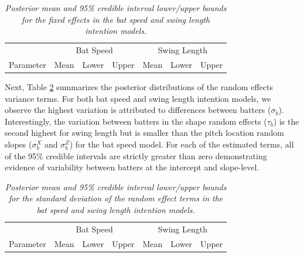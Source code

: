 \documentclass{article}
\begin{document}
      \begin{table}
        \centering
        \begin{tabular}{l|rrr|rrr|}
                  & \multicolumn{3}{c|}{Bat Speed}          & \multicolumn{3}{c|}{Swing Length}  \\
        Parameter & Mean  & Lower  & Upper & Mean  & Lower  & Upper \\
          \hline
          
        \end{tabular}
        \caption{\it Posterior mean and 95\% credible interval lower/upper bounds for the fixed effects in the bat speed and swing length intention models.}
        \label{tab:fixed-effects}
      \end{table}

      Next, Table \ref{tab:intention-variances} summarizes the posterior distributions of the random effects variance terms. For both bat speed and swing length intention models, we observe the highest variation is attributed to differences between batters ($\sigma_b$). Interestingly, the variation between batters in the shape random effects ($\tau_b$) is the second highest for swing length but is smaller than the pitch location random slopes ($\sigma_b^X$ and $\sigma_b^Z$) for the bat speed model. For each of the estimated terms, all of the 95\% credible intervals are strictly greater than zero demonstrating evidence of variability between batters at the intercept and slope-level.
       
      \begin{table}
        \centering
        \begin{tabular}{l|rrr|rrr|}
                  & \multicolumn{3}{c|}{Bat Speed}          & \multicolumn{3}{c|}{Swing Length}  \\
        Parameter & Mean  & Lower  & Upper & Mean  & Lower  & Upper \\
          \hline
          
        \end{tabular}
        \caption{\it Posterior mean and 95\% credible interval lower/upper bounds for the standard deviation of the random effect terms in the bat speed and swing length intention models.}
        \label{tab:intention-variances}
      \end{table}
\end{document}
